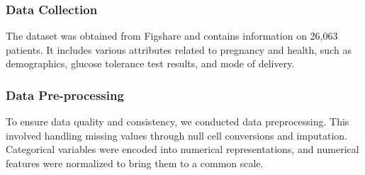 \documentclass[conference,compsoc]{IEEEtran}
\begin{document}
\subsubsection{Data Collection}
The dataset was obtained from Figshare and contains information on 26,063 patients. It includes various attributes related to pregnancy and health, such as demographics, glucose tolerance test results, and mode of delivery.

\subsubsection{Data Pre-processing}
To ensure data quality and consistency, we conducted data preprocessing. This involved handling missing values through null cell conversions and imputation. Categorical variables were encoded into numerical representations, and numerical features were normalized to bring them to a common scale.\\
\end{document}
